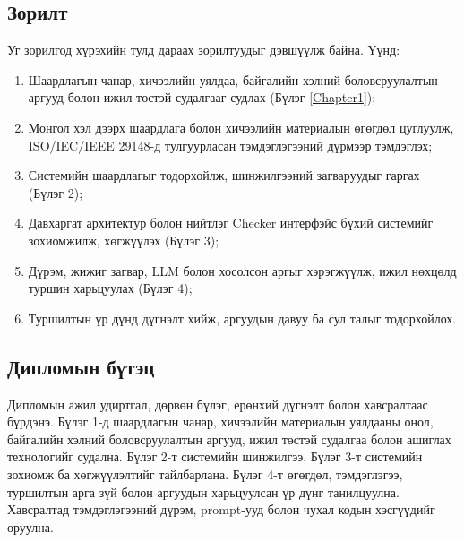 \subsection*{Зорилт}
Уг зорилгод хүрэхийн тулд дараах зорилтуудыг дэвшүүлж байна. Үүнд:
\begin{enumerate}[nosep]
    \item Шаардлагын чанар, хичээлийн уялдаа, байгалийн хэлний боловсруулалтын аргууд болон ижил төстэй судалгааг судлах (Бүлэг \ref{Chapter1});
    \item Монгол хэл дээрх шаардлага болон хичээлийн материалын өгөгдөл цуглуулж, ISO/IEC/IEEE 29148-д тулгуурласан тэмдэглэгээний дүрмээр тэмдэглэх;
    \item Системийн шаардлагыг тодорхойлж, шинжилгээний загваруудыг гаргах (Бүлэг 2);
    \item Давхаргат архитектур болон нийтлэг Checker интерфэйс бүхий системийг зохиомжилж, хөгжүүлэх (Бүлэг 3);
    \item Дүрэм, жижиг загвар, LLM болон хосолсон аргыг хэрэгжүүлж, ижил нөхцөлд туршин харьцуулах (Бүлэг 4);
    \item Туршилтын үр дүнд дүгнэлт хийж, аргуудын давуу ба сул талыг тодорхойлох.
\end{enumerate}

\subsection*{Дипломын бүтэц}
Дипломын ажил удиртгал, дөрвөн бүлэг, ерөнхий дүгнэлт болон хавсралтаас бүрдэнэ. Бүлэг 1-д шаардлагын чанар, хичээлийн материалын уялдааны онол, байгалийн хэлний боловсруулалтын аргууд, ижил төстэй судалгаа болон ашиглах технологийг судална. Бүлэг 2-т системийн шинжилгээ, Бүлэг 3-т системийн зохиомж ба хөгжүүлэлтийг тайлбарлана. Бүлэг 4-т өгөгдөл, тэмдэглэгээ, туршилтын арга зүй болон аргуудын харьцуулсан үр дүнг танилцуулна. Хавсралтад тэмдэглэгээний дүрэм, prompt-ууд болон чухал кодын хэсгүүдийг оруулна.
